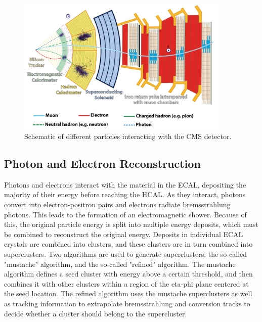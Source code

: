 \begin{figure}
  \centering
   \includegraphics[width=0.9\textwidth]{fig/experiment/reconstruction/cms_detector.png}
	\caption{Schematic of different particles interacting with the CMS detector.}
\end{figure}

\subsection{Photon and Electron Reconstruction}
Photons and electrons interact with the material in the ECAL, depositing the majority of their energy before reaching the HCAL. As they interact, photons convert into 
electron-positron pairs and electrons radiate bremsstrahlung photons. This leads to the formation of an electromagnetic shower. Because of this, the original particle energy 
is split into multiple energy deposits, which must be combined to reconstruct the original energy. Deposits in individual ECAL crystals are combined into clusters, 
and these clusters are in turn combined into superclusters. Two algorithms are used to generate superclusters: the so-called "mustache" algorithm, and the so-called "refined" algorithm.
The mustache algorithm defines a seed cluster with energy above a certain threshold, and then combines it with other clusters within a region of the eta-phi plane centered at the 
seed location. The refined algorithm uses the mustache superclusters as well as tracking information to extrapolate bremsstrahlung and conversion tracks to decide whether a cluster should belong 
to the supercluster. 

